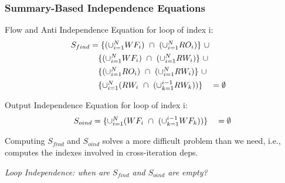 \documentclass{beamer}
\renewcommand{\emph}[1]{\textcolor{structure}{#1}}
\newcommand{\emp}[1]{\textcolor{DikuRed}{ #1}}
\begin{document}
\begin{frame}[fragile,t]
  \frametitle{Summary-Based Independence Equations}
\bigskip
Flow and Anti Independence Equation for loop of index \emph{i}:
\begin{equation} \label{FIEq} 
\begin{array}{l r}
S_{find} = \{(\cup_{i=1}^{N} WF_i) \mbox{ }\cap\mbox{ } (\cup_{i=1}^{N} RO_i)\} \mbox{ }\cup & \vspace{1ex} \\ \mbox{ }\mbox{ }\mbox{ }\mbox{ }\mbox{ }\mbox{ }\mbox{ }\mbox{ }\mbox{ }\mbox{ }
\{(\cup_{i=1}^{N} WF_i) \mbox{ }\cap\mbox{ } (\cup_{i=1}^{N} RW_i)\} \mbox{ }\cup & \vspace{1ex} \\ \mbox{ }\mbox{ }\mbox{ }\mbox{ }\mbox{ }\mbox{ }\mbox{ }\mbox{ }\mbox{ }\mbox{ }
\{(\cup_{i=1}^{N}RO_i) \mbox{ }\cap\mbox{ } (\cup_{i=1}^{N}RW_i)\} \mbox{ }\cup  & \vspace{1ex} \\ \mbox{ }\mbox{ }\mbox{ }\mbox{ }\mbox{ }\mbox{ }\mbox{ }\mbox{ }\mbox{ }\mbox{ }
\{ \cup_{i=1}^{N}(RW_i \mbox{ }\cap\mbox{ } (\cup_{k=1}^{i-1}RW_k))\} \mbox{ }\mbox{ }\mbox{ } = \emptyset
\end{array}
\end{equation}

\bigskip

\pause

Output Independence Equation for loop of index \emph{i}:
\begin{equation} \label{OIEq} 
\begin{array}{l r}
S_{oind} = \{ \cup_{i=1}^{N}(WF_i \mbox{ }\cap\mbox{ } (\cup_{k=1}^{i-1}WF_k))\} \mbox{ }\mbox{ }\mbox{ } = \emptyset
\end{array}
\end{equation}

\bigskip

\pause

Computing $S_{find}$ and $S_{oind}$ solves a more difficult problem than we need, 
i.e., computes the indexes involved in cross-iteration deps. \bigskip

\emp{{\em Loop Independence: when are $S_{find}$ and $S_{oind}$ are empty?}}

\end{frame}


\end{document}
